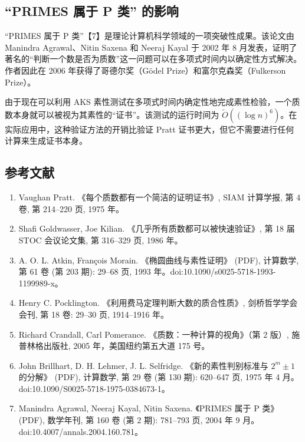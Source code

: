 \subsection{“PRIMES 属于 P 类” 的影响}

“PRIMES 属于 P 类”【7】是理论计算机科学领域的一项突破性成果。该论文由 Manindra Agrawal、Nitin Saxena 和 Neeraj Kayal 于 2002 年 8 月发表，证明了著名的“判断一个数是否为质数”这一问题可以在多项式时间内以确定性方式解决。作者因此在 2006 年获得了哥德尔奖（Gödel Prize）和富尔克森奖（Fulkerson Prize）。

由于现在可以利用 AKS 素性测试在多项式时间内确定性地完成素性检验，一个质数本身就可以被视为其素性的“证书”。该测试的运行时间为 $\tilde{O}((\log n)^6)$。在实际应用中，这种验证方法的开销比验证 Pratt 证书更大，但它不需要进行任何计算来生成证书本身。
\subsection{参考文献}
\begin{enumerate}
\item Vaughan Pratt. 《每个质数都有一个简洁的证明证书》, SIAM 计算学报, 第 4 卷, 第 214–220 页, 1975 年。
\item Shafi Goldwasser, Joe Kilian. 《几乎所有质数都可以被快速验证》, 第 18 届 STOC 会议论文集, 第 316–329 页, 1986 年。
\item A. O. L. Atkin, François Morain. 《椭圆曲线与素性证明》 (PDF), 计算数学, 第 61 卷 (第 203 期): 29–68 页, 1993 年。doi:10.1090/s0025-5718-1993-1199989-x。
\item Henry C. Pocklington. 《利用费马定理判断大数的质合性质》, 剑桥哲学学会会刊, 第 18 卷: 29–30 页, 1914–1916 年。
\item Richard Crandall, Carl Pomerance. 《质数：一种计算的视角》（第 2 版）, 施普林格出版社, 2005 年，美国纽约第五大道 175 号。
\item John Brillhart, D. H. Lehmer, J. L. Selfridge. 《新的素性判别标准与 $2^m \pm 1$ 的分解》 (PDF), 计算数学, 第 29 卷 (第 130 期): 620–647 页, 1975 年 4 月。doi:10.1090/S0025-5718-1975-0384673-1。
\item Manindra Agrawal, Neeraj Kayal, Nitin Saxena. 《PRIMES 属于 P 类》 (PDF), 数学年刊, 第 160 卷 (第 2 期): 781–793 页, 2004 年 9 月。doi:10.4007/annals.2004.160.781。
\end{enumerate}
